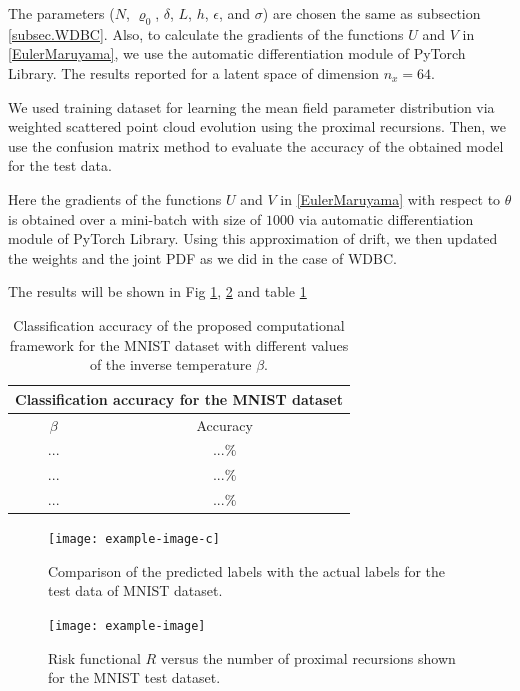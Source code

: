 \documentclass{article}
\begin{document}
The parameters ($N$, $\varrho_0$, $\delta$, $L$, $h$, $\epsilon$, and $\sigma$) are chosen the same as subsection \ref{subsec.WDBC}.
Also, to calculate the gradients of the functions $U$ and $V$ in \eqref{EulerMaruyama}, we use the automatic differentiation module of PyTorch Library.
The results reported for a latent space of dimension $n_x = 64$.

We used training dataset for learning the mean field parameter distribution via weighted scattered point cloud evolution using the proximal recursions. Then, we use the confusion matrix method \cite{visa2011confusion} to evaluate the accuracy of the obtained model for the test data.


Here the gradients of the functions $U$ and $V$ in \eqref{EulerMaruyama} with respect to $\theta$ is obtained over a mini-batch with size of $1000$ via automatic differentiation module of PyTorch Library. Using this approximation of drift, we then updated the weights and the joint PDF as we did in the case of WDBC.

 The results will be shown in Fig \ref{fig_f_hat_MNIST}, \ref{fig_risk_MNIST} and table \ref{tab:accuracy_MNIST} \color{black}


\begin{table}[h!]
\centering
 \begin{tabular}{|c c|} 
 \hline
  \multicolumn{2}{|c|}{Classification accuracy for the MNIST dataset} \\
 \hline\hline
 $\beta$ & Accuracy   \\  
 \hline
 ...  & $...\%$ \\
 ...&    $... \%$  \\
 ... &$...\%$ \\
 \hline
 \end{tabular}
     \caption{Classification accuracy of the proposed computational framework for the MNIST dataset with different values of the inverse temperature $\beta$.}
\label{tab:accuracy_MNIST}
\end{table}



\begin{figure}[h]
\centering
\noindent\texttt{[image: example-image-c]} 
\caption{Comparison of the predicted labels with the actual labels for the test data of MNIST dataset.}
\label{fig_f_hat_MNIST}
\end{figure}

\begin{figure}[h]
\centering
\noindent\texttt{[image: example-image]} 
\caption{Risk functional $R$ versus the number of proximal recursions shown for the MNIST test dataset.}
\label{fig_risk_MNIST}
\end{figure}


\clearpage


\end{document}
